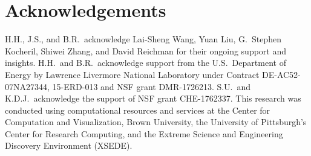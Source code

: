 \section{Acknowledgements}
H.H., J.S., and B.R.~acknowledge Lai-Sheng Wang, Yuan Liu, G.~Stephen Kocheril, Shiwei Zhang, and David Reichman for their ongoing support and insights.
H.H.~and B.R.~acknowledge support from the U.S.~Department of Energy by Lawrence Livermore National Laboratory under Contract DE-AC52-07NA27344, 15-ERD-013 and NSF grant DMR-1726213.
S.U.~and K.D.J.~acknowledge the support of NSF grant CHE-1762337.
This research was conducted using computational resources and services at the Center for Computation and Visualization, Brown University, the University of Pittsburgh's Center for Research Computing, and the Extreme Science and Engineering Discovery Environment (XSEDE). 


